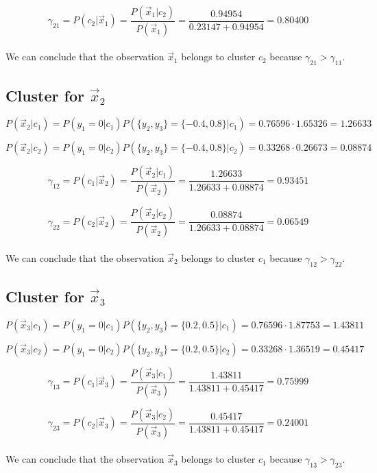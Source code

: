 \documentclass{article}
\begin{document}
\[ \gamma_{21} = P(c_2| \vec{x}_1) = \frac{P(\vec{x}_1 | c_2)}{P(\vec{x}_1)} = \frac{0.94954}{0.23147 + 0.94954} = 0.80400 \]

\paragraph{} We can conclude that the observation $\vec{x}_1$ belongs to cluster $c_2$ because $\gamma_{21} > \gamma_{11}$.

\subsection*{Cluster for $\vec{x}_2$}

\[ P(\vec{x}_2 | c_1) = P(y_1 = 0 | c_1) P(\{y_2, y_3\}  = \{-0.4, 0.8\} | c_1) = 0.76596 \cdot 1.65326   = 1.26633 \]

\[ P(\vec{x}_2 | c_2) = P(y_1 = 0 | c_2) P(\{y_2, y_3\}  = \{-0.4, 0.8\} | c_2) = 0.33268 \cdot 0.26673   = 0.08874 \]

\[ \gamma_{12} = P(c_1| \vec{x}_2) = \frac{P(\vec{x}_2 | c_1)}{P(\vec{x}_2)} = \frac{1.26633}{1.26633 + 0.08874} = 0.93451 \]

\[ \gamma_{22} = P(c_2| \vec{x}_2) = \frac{P(\vec{x}_2 | c_2)}{P(\vec{x}_2)} = \frac{0.08874}{1.26633 + 0.08874} = 0.06549 \]

\paragraph{} We can conclude that the observation $\vec{x}_2$ belongs to cluster $c_1$ because $\gamma_{12} > \gamma_{22}$.

\subsection*{Cluster for $\vec{x}_3$}

\[ P(\vec{x}_3 | c_1) = P(y_1 = 0 | c_1) P(\{y_2, y_3\}  = \{0.2, 0.5\} | c_1) = 0.76596 \cdot 1.87753  = 1.43811 \]

\[ P(\vec{x}_3 | c_2) = P(y_1 = 0 | c_2) P(\{y_2, y_3\}  = \{0.2, 0.5\} | c_2) = 0.33268 \cdot 1.36519  = 0.45417 \]

\[ \gamma_{13} = P(c_1| \vec{x}_3) = \frac{P(\vec{x}_3 | c_1)}{P(\vec{x}_3)} = \frac{1.43811}{1.43811 + 0.45417} = 0.75999 \]

\[ \gamma_{23} = P(c_2| \vec{x}_3) = \frac{P(\vec{x}_3 | c_2)}{P(\vec{x}_3)} = \frac{0.45417}{1.43811 + 0.45417} = 0.24001 \]

\paragraph{} We can conclude that the observation $\vec{x}_3$ belongs to cluster $c_1$ because $\gamma_{13} > \gamma_{23}$.
\end{document}
